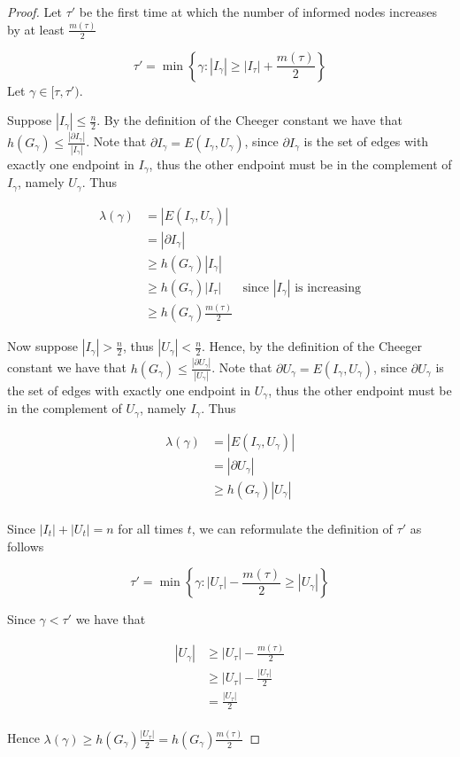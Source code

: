 \documentclass[a4paper,11pt]{article}
\theoremstyle{definition}
\begin{document}
\begin{proof}

	Let $\tau'$ be the first time at which the number of informed nodes increases by at least $\frac{m(\tau)}{2}$ 
	
	$$
		\tau' = \min\left\{\gamma : |I_{\gamma}| \geq |I_\tau| + \frac{m(\tau)}{2}\right\}
	$$
	Let $ \gamma \in [\tau, \tau')$.

	Suppose  $|I_\gamma| \leq \frac{n}{2}$. By the definition of the Cheeger constant we have that $h(G_\gamma) \leq \frac{|\partial I_\gamma|}{|I_\gamma|}$. Note that $ \partial I_\gamma = E(I_\gamma, U_\gamma)$, since $\partial I_\gamma$ is the set of edges with exactly one endpoint in $I_\gamma$, thus the other endpoint must be in the complement of $I_\gamma$, namely $U_\gamma$. Thus

	\begin{align*}
		\lambda(\gamma) &= |E(I_\gamma, U_\gamma)| \\
		& = |\partial I_\gamma| \\
		& \geq h(G_\gamma) |I_\gamma| \\
		& \geq h(G_\gamma) |I_\tau| & \text{since } |I_\gamma| \text{ is increasing} \\
		& \geq h(G_\gamma) \frac{m(\tau)}{2}
	\end{align*}
		
	Now suppose $|I_\gamma| > \frac{n}{2}$, thus $|U_\gamma| < \frac{n}{2}$. Hence, by the definition of the Cheeger constant we have that $h(G_\gamma) \leq \frac{|\partial U_\gamma|}{|U_\gamma|}$. Note that $ \partial U_\gamma = E(I_\gamma, U_\gamma)$, since $\partial U_\gamma$ is the set of edges with exactly one endpoint in $U_\gamma$,  thus the other endpoint must be in the complement of $U_\gamma$, namely $I_\gamma$. Thus 

	\begin{align*}
		\lambda(\gamma) &= |E(I_\gamma, U_\gamma)| \\
		& = |\partial U_\gamma| \\
		& \geq h(G_\gamma) |U_\gamma| \\
	\end{align*} 

	Since $|I_t| + |U_t| = n$ for all times $t$, we can reformulate the definition of $\tau'$ as follows

	$$
		\tau' = \min \left\{ \gamma : |U_\tau| - \frac{m(\tau)}{2} \geq |U_\gamma| \right\} 
	$$ 
	
	Since $\gamma < \tau'$ we have that

	\begin{align*}
		|U_\gamma| & \geq |U_\tau| - \frac{m(\tau)}{2} \\
		& \geq |U_\tau| - \frac{|U_\tau|}{2} \\
		& = \frac{|U_\tau|}{2} \\
	\end{align*}
	
	Hence $\lambda(\gamma) \geq h(G_\gamma)\frac{|U_\tau|}{2} = h(G_\gamma)\frac{m(\tau)}{2}$

\end{proof}
\end{document}
